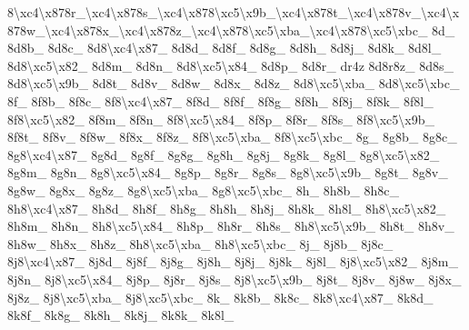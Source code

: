 {8\textbackslash{}xc4\textbackslash{}x878r\-\_\textbackslash{}xc4\textbackslash{}x878s\-\_\textbackslash{}xc4\textbackslash{}x878\textbackslash{}xc5\textbackslash{}x9b\-\_\textbackslash{}xc4\textbackslash{}x878t\-\_\textbackslash{}xc4\textbackslash{}x878v\-\_\textbackslash{}xc4\textbackslash{}x878w\-\_\textbackslash{}xc4\textbackslash{}x878x\-\_\textbackslash{}xc4\textbackslash{}x878z\-\_\textbackslash{}xc4\textbackslash{}x878\textbackslash{}xc5\textbackslash{}xba\-\_\textbackslash{}xc4\textbackslash{}x878\textbackslash{}xc5\textbackslash{}xbc\-\_\- 8d\-\_\- 8d8b\-\_\- 8d8c\-\_\- 8d8\textbackslash{}xc4\textbackslash{}x87\-\_\- 8d8d\-\_\- 8d8f\-\_\- 8d8g\-\_\- 8d8h\-\_\- 8d8j\-\_\- 8d8k\-\_\- 8d8l\-\_\- 8d8\textbackslash{}xc5\textbackslash{}x82\-\_\- 8d8m\-\_\- 8d8n\-\_\- 8d8\textbackslash{}xc5\textbackslash{}x84\-\_\- 8d8p\-\_\- 8d8r\-\_\- dr4z 8d8r8z\-\_\- 8d8s\-\_\- 8d8\textbackslash{}xc5\textbackslash{}x9b\-\_\- 8d8t\-\_\- 8d8v\-\_\- 8d8w\-\_\- 8d8x\-\_\- 8d8z\-\_\- 8d8\textbackslash{}xc5\textbackslash{}xba\-\_\- 8d8\textbackslash{}xc5\textbackslash{}xbc\-\_\- 8f\-\_\- 8f8b\-\_\- 8f8c\-\_\- 8f8\textbackslash{}xc4\textbackslash{}x87\-\_\- 8f8d\-\_\- 8f8f\-\_\- 8f8g\-\_\- 8f8h\-\_\- 8f8j\-\_\- 8f8k\-\_\- 8f8l\-\_\- 8f8\textbackslash{}xc5\textbackslash{}x82\-\_\- 8f8m\-\_\- 8f8n\-\_\- 8f8\textbackslash{}xc5\textbackslash{}x84\-\_\- 8f8p\-\_\- 8f8r\-\_\- 8f8s\-\_\- 8f8\textbackslash{}xc5\textbackslash{}x9b\-\_\- 8f8t\-\_\- 8f8v\-\_\- 8f8w\-\_\- 8f8x\-\_\- 8f8z\-\_\- 8f8\textbackslash{}xc5\textbackslash{}xba\-\_\- 8f8\textbackslash{}xc5\textbackslash{}xbc\-\_\- 8g\-\_\- 8g8b\-\_\- 8g8c\-\_\- 8g8\textbackslash{}xc4\textbackslash{}x87\-\_\- 8g8d\-\_\- 8g8f\-\_\- 8g8g\-\_\- 8g8h\-\_\- 8g8j\-\_\- 8g8k\-\_\- 8g8l\-\_\- 8g8\textbackslash{}xc5\textbackslash{}x82\-\_\- 8g8m\-\_\- 8g8n\-\_\- 8g8\textbackslash{}xc5\textbackslash{}x84\-\_\- 8g8p\-\_\- 8g8r\-\_\- 8g8s\-\_\- 8g8\textbackslash{}xc5\textbackslash{}x9b\-\_\- 8g8t\-\_\- 8g8v\-\_\- 8g8w\-\_\- 8g8x\-\_\- 8g8z\-\_\- 8g8\textbackslash{}xc5\textbackslash{}xba\-\_\- 8g8\textbackslash{}xc5\textbackslash{}xbc\-\_\- 8h\-\_\- 8h8b\-\_\- 8h8c\-\_\- 8h8\textbackslash{}xc4\textbackslash{}x87\-\_\- 8h8d\-\_\- 8h8f\-\_\- 8h8g\-\_\- 8h8h\-\_\- 8h8j\-\_\- 8h8k\-\_\- 8h8l\-\_\- 8h8\textbackslash{}xc5\textbackslash{}x82\-\_\- 8h8m\-\_\- 8h8n\-\_\- 8h8\textbackslash{}xc5\textbackslash{}x84\-\_\- 8h8p\-\_\- 8h8r\-\_\- 8h8s\-\_\- 8h8\textbackslash{}xc5\textbackslash{}x9b\-\_\- 8h8t\-\_\- 8h8v\-\_\- 8h8w\-\_\- 8h8x\-\_\- 8h8z\-\_\- 8h8\textbackslash{}xc5\textbackslash{}xba\-\_\- 8h8\textbackslash{}xc5\textbackslash{}xbc\-\_\- 8j\-\_\- 8j8b\-\_\- 8j8c\-\_\- 8j8\textbackslash{}xc4\textbackslash{}x87\-\_\- 8j8d\-\_\- 8j8f\-\_\- 8j8g\-\_\- 8j8h\-\_\- 8j8j\-\_\- 8j8k\-\_\- 8j8l\-\_\- 8j8\textbackslash{}xc5\textbackslash{}x82\-\_\- 8j8m\-\_\- 8j8n\-\_\- 8j8\textbackslash{}xc5\textbackslash{}x84\-\_\- 8j8p\-\_\- 8j8r\-\_\- 8j8s\-\_\- 8j8\textbackslash{}xc5\textbackslash{}x9b\-\_\- 8j8t\-\_\- 8j8v\-\_\- 8j8w\-\_\- 8j8x\-\_\- 8j8z\-\_\- 8j8\textbackslash{}xc5\textbackslash{}xba\-\_\- 8j8\textbackslash{}xc5\textbackslash{}xbc\-\_\- 8k\-\_\- 8k8b\-\_\- 8k8c\-\_\- 8k8\textbackslash{}xc4\textbackslash{}x87\-\_\- 8k8d\-\_\- 8k8f\-\_\- 8k8g\-\_\- 8k8h\-\_\- 8k8j\-\_\- 8k8k\-\_\- 8k8l\-\_\- }

